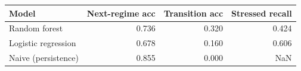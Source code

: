 \begin{tabular}{lrrr}
\toprule
Model & Next-regime acc & Transition acc & Stressed recall \\
\midrule
Random forest & 0.736 & 0.320 & 0.424 \\
Logistic regression & 0.678 & 0.160 & 0.606 \\
Naive (persistence) & 0.855 & 0.000 & NaN \\
\bottomrule
\end{tabular}
